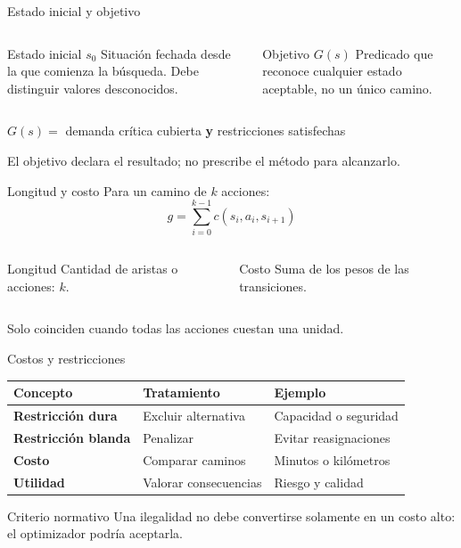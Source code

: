 \documentclass[aspectratio=169,11pt]{beamer}
\begin{document}
\begin{frame}{Estado inicial y objetivo}
  \begin{columns}[c]
      \begin{block}{Estado inicial $s_0$}
        Situación fechada desde la que comienza la búsqueda. Debe distinguir valores desconocidos.
      \end{block}
      \begin{block}{Objetivo $G(s)$}
        Predicado que reconoce cualquier estado aceptable, no un único camino.
      \end{block}
  \end{columns}
  \vfill
  \begin{center}
    $G(s)=$ demanda crítica cubierta \textbf{y} restricciones satisfechas
  \end{center}
  \alert{El objetivo declara el resultado; no prescribe el método para alcanzarlo.}
\end{frame}

\begin{frame}{Longitud y costo}
  Para un camino de $k$ acciones:
  \[
    g=\sum_{i=0}^{k-1}c(s_i,a_i,s_{i+1})
  \]
  \begin{columns}[T]
      \begin{block}{Longitud}
        Cantidad de aristas o acciones: $k$.
      \end{block}
      \begin{block}{Costo}
        Suma de los pesos de las transiciones.
      \end{block}
  \end{columns}
  \alert{Solo coinciden cuando todas las acciones cuestan una unidad.}
\end{frame}

\begin{frame}{Costos y restricciones}
  \small
  \begin{tabularx}{\textwidth}{>{\bfseries}p{}p{}X}
    \toprule
    Concepto & Tratamiento & Ejemplo \\\midrule
    Restricción dura & Excluir alternativa & Capacidad o seguridad \\
    Restricción blanda & Penalizar & Evitar reasignaciones \\
    Costo & Comparar caminos & Minutos o kilómetros \\
    Utilidad & Valorar consecuencias & Riesgo y calidad \\
    \bottomrule
  \end{tabularx}
  \vfill
  \begin{alertblock}{Criterio normativo}
    Una ilegalidad no debe convertirse solamente en un costo alto: el optimizador podría aceptarla.
  \end{alertblock}
\end{frame}
\end{document}
